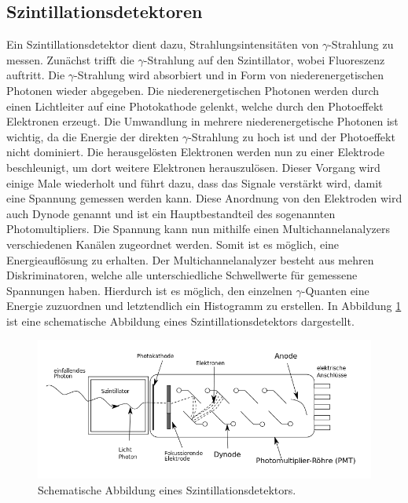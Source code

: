 \subsection{Szintillationsdetektoren}
Ein Szintillationsdetektor dient dazu, Strahlungsintensitäten von $\gamma$-Strahlung zu messen. Zunächst trifft die $\gamma$-Strahlung auf den Szintillator, wobei Fluoreszenz auftritt. Die $\gamma$-Strahlung wird absorbiert und in Form von niederenergetischen Photonen wieder abgegeben. 
Die niederenergetischen Photonen werden durch einen Lichtleiter auf eine Photokathode gelenkt, welche durch den Photoeffekt Elektronen erzeugt. Die Umwandlung in mehrere niederenergetische Photonen ist wichtig, da die Energie der direkten $\gamma$-Strahlung zu hoch ist und der Photoeffekt nicht dominiert.
Die herausgelösten Elektronen werden nun zu einer Elektrode beschleunigt, um dort weitere Elektronen herauszulösen. Dieser Vorgang wird einige Male wiederholt und führt dazu, dass das Signale verstärkt wird, damit eine Spannung gemessen werden kann.
Diese Anordnung von den Elektroden wird auch Dynode genannt und ist ein Hauptbestandteil des sogenannten Photomultipliers. 
Die Spannung kann nun mithilfe einen Multichannelanalyzers verschiedenen Kanälen zugeordnet werden. Somit ist es möglich, eine Energieauflösung zu erhalten. 
Der Multichannelanalyzer besteht aus mehren Diskriminatoren, welche alle unterschiedliche Schwellwerte für gemessene Spannungen haben. Hierdurch ist es möglich, den einzelnen $\gamma$-Quanten eine Energie zuzuordnen und letztendlich ein Histogramm zu erstellen.
In Abbildung \ref{fig:detektor} ist eine schematische Abbildung eines Szintillationsdetektors dargestellt.
\begin{figure}
    \centering
    \includegraphics[width = \linewidth]{content/detektor.png}
    \caption{Schematische Abbildung eines Szintillationsdetektors. \cite{detektor}}
    \label{fig:detektor}
\end{figure}
